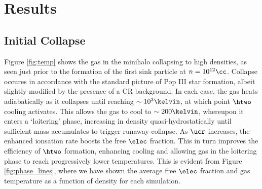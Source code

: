 \section{Results}
\label{sec:results}
\subsection{Initial Collapse}
\label{sec:initial_collapse}

Figure \ref{fig:temp} shows the gas in the minihalo collapsing to high densities, as seen just prior to the formation of the first sink particle at $n=10^{12}\cc$.  Collapse occures in accordance with the standard picture of Pop III star formation, albeit slightly modified by the presence of a CR background.  In each case, the gas heats adiabatically as it collapses until reaching $\sim10^3\kelvin$, at which point $\htwo$ cooling activates.  This allows the gas to cool to $\sim200\kelvin$, whereupon it enters a `loitering' phase, increasing in density quasi-hydrostatically until sufficient mass accumulates to trigger runaway collapse.  As $\ucr$ increases, the enhanced ionsation rate boosts the free $\elec$ fraction.  This in turn improves the efficiency of $\htwo$ formation, enhancing cooling and allowing gas in the loitering phase to reach progressively lower temperatures.  This is evident from Figure \ref{fig:phase_lines}, where we have shown the average free $\elec$ fraction and gas temperature as a function of density for each simulation.

